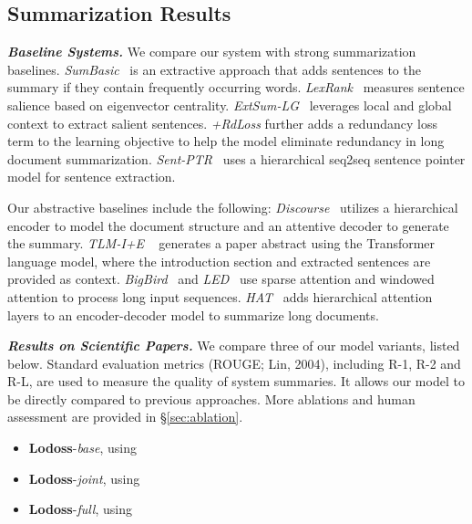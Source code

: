 \documentclass[11pt]{article}
\begin{document}
\subsection{Summarization Results}
\label{sec:results}

\noindent\textbf{\textsl{Baseline Systems.}}\quad
We compare our system with strong summarization baselines.
\textsl{SumBasic}~\cite{Vanderwende:2007} is an extractive approach that adds sentences to the summary if they contain frequently occurring words.
\textsl{LexRank}~\cite{Erkan:2004} measures sentence salience based on eigenvector centrality.
\textsl{ExtSum-LG}~\cite{xiao-carenini-2019-extractive,xiao-carenini-2020-systematically} leverages local and global context to extract salient sentences.
\textsl{+RdLoss} further adds a redundancy loss term to the learning objective to help the model eliminate redundancy in long document summarization.
\textsl{Sent-PTR}~\cite{pilault-etal-2020-extractive} uses a hierarchical seq2seq sentence pointer model for sentence extraction.


Our abstractive baselines include the following:
\textsl{Discourse}~\cite{cohan-etal-2018-discourse} utilizes a hierarchical encoder to model the document structure and an attentive decoder to generate the summary.
\textsl{TLM-I+E} ~\cite{pilault-etal-2020-extractive} generates a paper abstract using the Transformer language model, where the introduction section and extracted sentences are provided as context.
\textsl{BigBird}~\cite{zaheer2020bigbird} and \textit{LED}~\cite{Beltagy:2020} use sparse attention and windowed attention to process long input sequences.
\textsl{HAT}~\cite{Rohde-etal_2020} adds hierarchical attention layers to an encoder-decoder model to summarize long documents. 

\vspace{0.05in}
\noindent\textbf{\textsl{Results on Scientific Papers.}}\quad
We compare three of our model variants, listed below. 
Standard evaluation metrics (ROUGE; Lin, 2004)\nocite{lin-2004-rouge},
including R-1, R-2 and R-L, are used to measure the quality of system summaries.
It allows our model to be directly compared to previous approaches.
More ablations and human assessment are provided in \S\ref{sec:ablation}.
\begin{itemize}[topsep=3pt,itemsep=0pt,leftmargin=*]
\item \textbf{Lodoss}-\emph{base}, using 
\item \textbf{Lodoss}-\emph{joint}, using 
\item \textbf{Lodoss}-\emph{full}, using 
\end{itemize}
\end{document}
